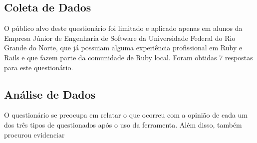 \subsection{Coleta de Dados}

O público alvo deste questionário foi limitado e aplicado apenas em alunos da Empresa Júnior de Engenharia de Software da Universidade Federal do Rio Grande do Norte, que já possuiam alguma experiência profissional em Ruby e Rails e que fazem parte da comunidade de Ruby local. Foram obtidas 7 respostas para este questionário.

\subsection{Análise de Dados}

O questionário se preocupa em relatar o que ocorreu com a opinião de cada um dos três tipos de questionados após o uso da ferramenta. Além disso, também procurou evidenciar 